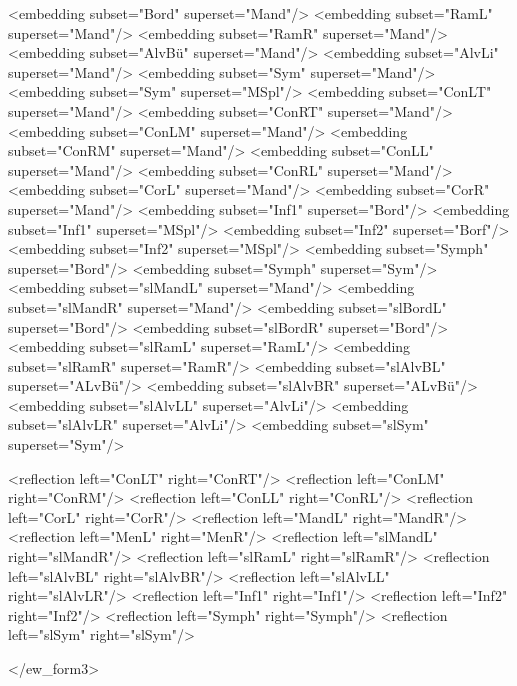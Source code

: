 \begin{DoxyVerbInclude}
<embedding subset="Bord" superset="Mand"/>
<embedding subset="RamL" superset="Mand"/>
<embedding subset="RamR" superset="Mand"/>
<embedding subset="AlvBü" superset="Mand"/>
<embedding subset="AlvLi" superset="Mand"/>
<embedding subset="Sym" superset="Mand"/>
<embedding subset="Sym" superset="MSpl"/>
<embedding subset="ConLT" superset="Mand"/>
<embedding subset="ConRT" superset="Mand"/>
<embedding subset="ConLM" superset="Mand"/>
<embedding subset="ConRM" superset="Mand"/>
<embedding subset="ConLL" superset="Mand"/>
<embedding subset="ConRL" superset="Mand"/>
<embedding subset="CorL" superset="Mand"/>
<embedding subset="CorR" superset="Mand"/>
<embedding subset="Inf1" superset="Bord"/>
<embedding subset="Inf1" superset="MSpl"/>
<embedding subset="Inf2" superset="Borf"/>
<embedding subset="Inf2" superset="MSpl"/>
<embedding subset="Symph" superset="Bord"/>
<embedding subset="Symph" superset="Sym"/>
<embedding subset="slMandL" superset="Mand"/>
<embedding subset="slMandR" superset="Mand"/>
<embedding subset="slBordL" superset="Bord"/>
<embedding subset="slBordR" superset="Bord"/>
<embedding subset="slRamL" superset="RamL"/>
<embedding subset="slRamR" superset="RamR"/>
<embedding subset="slAlvBL" superset="ALvBü"/>
<embedding subset="slAlvBR" superset="ALvBü"/>
<embedding subset="slAlvLL" superset="AlvLi"/>
<embedding subset="slAlvLR" superset="AlvLi"/>
<embedding subset="slSym" superset="Sym"/>

<reflection left="ConLT" right="ConRT"/>
<reflection left="ConLM" right="ConRM"/>
<reflection left="ConLL" right="ConRL"/>
<reflection left="CorL" right="CorR"/>
<reflection left="MandL" right="MandR"/>
<reflection left="MenL" right="MenR"/>
<reflection left="slMandL" right="slMandR"/>
<reflection left="slRamL" right="slRamR"/>
<reflection left="slAlvBL" right="slAlvBR"/>
<reflection left="slAlvLL" right="slAlvLR"/>
<reflection left="Inf1" right="Inf1"/>
<reflection left="Inf2" right="Inf2"/>
<reflection left="Symph" right="Symph"/>
<reflection left="slSym" right="slSym"/>

</ew_form3>
\end{DoxyVerbInclude}
 